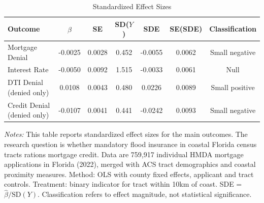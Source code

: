 \begin{table}[htbp]
\centering
\caption{Standardized Effect Sizes}
\label{tab:sde}
\small
\begin{tabular}{lcccccc}
\hline\hline
Outcome & $\hat{\beta}$ & SE & SD($Y$) & SDE & SE(SDE) & Classification \\
\hline
Mortgage Denial & -0.0025 & 0.0028 & 0.452 & -0.0055 & 0.0062 & Small negative \\
Interest Rate & -0.0050 & 0.0092 & 1.515 & -0.0033 & 0.0061 & Null \\
DTI Denial (denied only) & 0.0108 & 0.0043 & 0.480 & 0.0226 & 0.0089 & Small positive \\
Credit Denial (denied only) & -0.0107 & 0.0041 & 0.441 & -0.0242 & 0.0093 & Small negative \\
\hline\hline
\end{tabular}
\begin{tablenotes}[flushleft]\small
\item \textit{Notes:} This table reports standardized effect sizes for the main outcomes. The research question is whether mandatory flood insurance in coastal Florida census tracts rations mortgage credit. Data are 759,917 individual HMDA mortgage applications in Florida (2022), merged with ACS tract demographics and coastal proximity measures. Method: OLS with county fixed effects, applicant and tract controls. Treatment: binary indicator for tract within 10km of coast. SDE = $\hat{\beta} / \text{SD}(Y)$. Classification refers to effect magnitude, not statistical significance.
\end{tablenotes}
\end{table}

